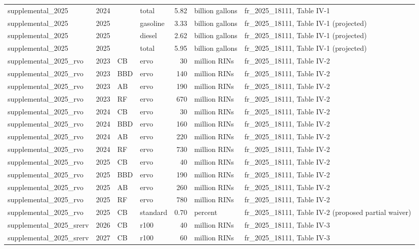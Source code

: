 \begin{longtable}{p{2.3cm}p{0.7cm}p{1.0cm}p{2.6cm}rp{1.7cm}p{4.6cm}}
supplemental\_2025 & 2024 &  & total & 5.82 & billion gallons & fr\_2025\_18111, Table IV-1 \\
supplemental\_2025 & 2025 &  & gasoline & 3.33 & billion gallons & fr\_2025\_18111, Table IV-1 (projected) \\
supplemental\_2025 & 2025 &  & diesel & 2.62 & billion gallons & fr\_2025\_18111, Table IV-1 (projected) \\
supplemental\_2025 & 2025 &  & total & 5.95 & billion gallons & fr\_2025\_18111, Table IV-1 (projected) \\
supplemental\_2025\_rvo & 2023 & CB & ervo & 30 & million RINs & fr\_2025\_18111, Table IV-2 \\
supplemental\_2025\_rvo & 2023 & BBD & ervo & 140 & million RINs & fr\_2025\_18111, Table IV-2 \\
supplemental\_2025\_rvo & 2023 & AB & ervo & 190 & million RINs & fr\_2025\_18111, Table IV-2 \\
supplemental\_2025\_rvo & 2023 & RF & ervo & 670 & million RINs & fr\_2025\_18111, Table IV-2 \\
supplemental\_2025\_rvo & 2024 & CB & ervo & 30 & million RINs & fr\_2025\_18111, Table IV-2 \\
supplemental\_2025\_rvo & 2024 & BBD & ervo & 160 & million RINs & fr\_2025\_18111, Table IV-2 \\
supplemental\_2025\_rvo & 2024 & AB & ervo & 220 & million RINs & fr\_2025\_18111, Table IV-2 \\
supplemental\_2025\_rvo & 2024 & RF & ervo & 730 & million RINs & fr\_2025\_18111, Table IV-2 \\
supplemental\_2025\_rvo & 2025 & CB & ervo & 40 & million RINs & fr\_2025\_18111, Table IV-2 \\
supplemental\_2025\_rvo & 2025 & BBD & ervo & 190 & million RINs & fr\_2025\_18111, Table IV-2 \\
supplemental\_2025\_rvo & 2025 & AB & ervo & 260 & million RINs & fr\_2025\_18111, Table IV-2 \\
supplemental\_2025\_rvo & 2025 & RF & ervo & 780 & million RINs & fr\_2025\_18111, Table IV-2 \\
supplemental\_2025\_rvo & 2025 & CB & standard & 0.70 & percent & fr\_2025\_18111, Table IV-2 (proposed partial waiver) \\
supplemental\_2025\_srerv & 2026 & CB & r100 & 40 & million RINs & fr\_2025\_18111, Table IV-3 \\
supplemental\_2025\_srerv & 2027 & CB & r100 & 60 & million RINs & fr\_2025\_18111, Table IV-3 \\

\end{longtable}
